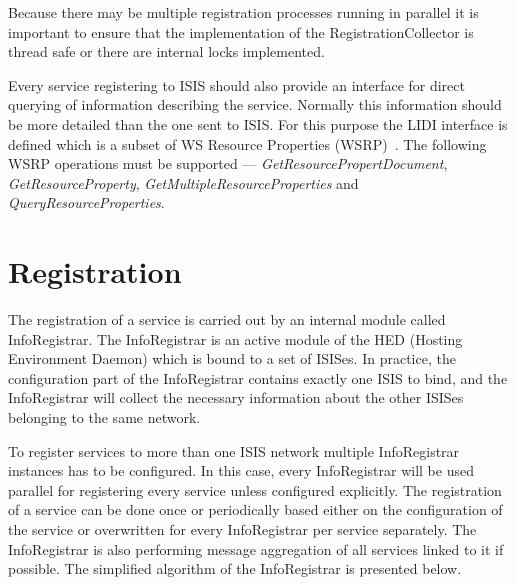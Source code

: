 \documentclass{book}
\begin{document}
Because there may be multiple registration processes running in parallel it is important to ensure that the
implementation of the RegistrationCollector is thread safe or there are internal locks implemented.

Every service registering to ISIS should also provide an interface for direct querying of information 
describing the service. Normally this information should be more detailed than the one sent to ISIS. For this 
purpose the LIDI interface is defined which is a subset of WS Resource Properties (WSRP)~\cite{wsrf-rp}. The following WSRP
operations must be supported --- \textit{GetResourcePropertDocument}, \textit{GetResourceProperty},
\textit{GetMultipleResourceProperties} and \textit{QueryResourceProperties}.




\section{Registration}
\label{sec:service_registration}

The registration of a service is carried out by an internal module called InfoRegistrar. The InfoRegistrar is an active module of the HED (Hosting Environment Daemon) which is bound to a set of ISISes. In practice, the configuration part of the InfoRegistrar contains exactly one ISIS to bind, and the InfoRegistrar will collect the necessary information about the other ISISes belonging to the same network.

To register services to more than one ISIS network multiple InfoRegistrar instances has to be configured. In this case, every InfoRegistrar will be used parallel for registering every service unless configured explicitly.
The registration of a service can be done once or periodically based either on the configuration of the service or overwritten for every InfoRegistrar per service separately. The InfoRegistrar is also performing message aggregation of all services linked to it if possible. The simplified algorithm of the InfoRegistrar is presented below.
\end{document}
